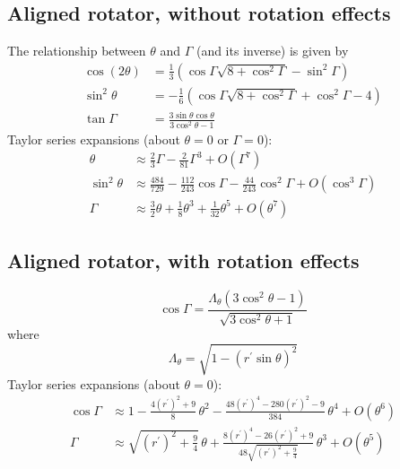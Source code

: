 \documentclass{book}
\begin{document}
\subsection{Aligned rotator, without rotation effects}
The relationship between $\theta$ and $\Gamma$ (and its inverse) is given by \citet{Gangadhara2004}
\begin{equation}
    \begin{aligned}
        \cos(2\theta) &= \frac13\left(\cos\Gamma\sqrt{8 + \cos^2\Gamma} - \sin^2\Gamma\right) \\
        \sin^2\theta  &= -\frac16\left(\cos\Gamma\sqrt{8 + \cos^2\Gamma} + \cos^2\Gamma - 4\right) \\
        \tan\Gamma &= \frac{3\sin\theta\cos\theta}{3\cos^2\theta - 1}
    \end{aligned}
    \label{eqn:beam-angle-aligned-no-rotation}
\end{equation}
Taylor series expansions (about $\theta = 0$ or $\Gamma = 0$):
\begin{equation}
    \begin{aligned}
        \theta &\approx \frac23 \Gamma - \frac2{81} \Gamma^3 + O(\Gamma^7) \\
        \sin^2\theta &\approx \frac{484}{729} - \frac{112}{243}\cos\Gamma - \frac{44}{243}\cos^2\Gamma + O(\cos^3\Gamma) \\
        \Gamma &\approx \frac32 \theta + \frac18 \theta^3 + \frac1{32} \theta^5 + O(\theta^7)
    \end{aligned}
\end{equation}

\subsection{Aligned rotator, with rotation effects}
\begin{equation}
    \cos\Gamma = \frac{\Lambda_\theta(3\cos^2\theta-1)}{\sqrt{3\cos^2\theta+1}}
\end{equation}
where
\begin{equation}
    \Lambda_\theta = \sqrt{1 - (r^\prime\sin\theta)^2}
\end{equation}
Taylor series expansions (about $\theta = 0$):
\begin{equation}
    \begin{aligned}
        \cos\Gamma &\approx 1 - \frac{4(r^\prime)^2+9}{8}\,\theta^2 -
                            \frac{48(r^\prime)^4 - 280(r^\prime)^2 - 9}{384}\,\theta^4 + O(\theta^6) \\
        \Gamma &\approx \sqrt{(r^\prime)^2 + \frac94}\,\theta +
                        \frac{8(r^\prime)^4 - 26(r^\prime)^2 + 9}{48\sqrt{(r^\prime)^2 + \frac94}}\,\theta^3 + O(\theta^5)
    \end{aligned}
\end{equation}
\end{document}
